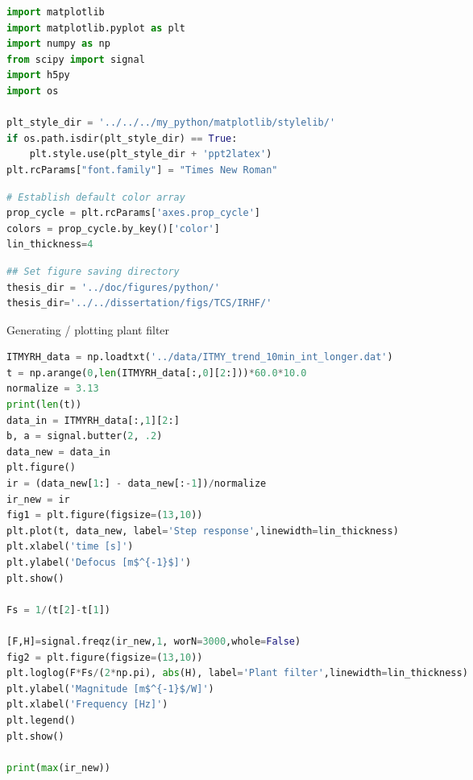 \begin{spacing}{1.2} \begin{lstlisting}[frame=single,language=Python]
import matplotlib
import matplotlib.pyplot as plt
import numpy as np
from scipy import signal
import h5py
import os

plt_style_dir = '../../../my_python/matplotlib/stylelib/'
if os.path.isdir(plt_style_dir) == True:
    plt.style.use(plt_style_dir + 'ppt2latex')
plt.rcParams["font.family"] = "Times New Roman"
\end{lstlisting} \end{spacing}

\begin{spacing}{1.2} \begin{lstlisting}[frame=single,language=Python]
# Establish default color array
prop_cycle = plt.rcParams['axes.prop_cycle']
colors = prop_cycle.by_key()['color']
lin_thickness=4
\end{lstlisting} \end{spacing}

\begin{spacing}{1.2} \begin{lstlisting}[frame=single,language=Python]
## Set figure saving directory
thesis_dir = '../doc/figures/python/'
thesis_dir='../../dissertation/figs/TCS/IRHF/'
\end{lstlisting} \end{spacing}

Generating / plotting plant filter

\begin{spacing}{1.2} \begin{lstlisting}[frame=single,language=Python]
ITMYRH_data = np.loadtxt('../data/ITMY_trend_10min_int_longer.dat')
t = np.arange(0,len(ITMYRH_data[:,0][2:]))*60.0*10.0
normalize = 3.13
print(len(t))
data_in = ITMYRH_data[:,1][2:]
b, a = signal.butter(2, .2)
data_new = data_in
plt.figure()
ir = (data_new[1:] - data_new[:-1])/normalize
ir_new = ir
fig1 = plt.figure(figsize=(13,10))
plt.plot(t, data_new, label='Step response',linewidth=lin_thickness)
plt.xlabel('time [s]')
plt.ylabel('Defocus [m$^{-1}$]')
plt.show()

Fs = 1/(t[2]-t[1])

[F,H]=signal.freqz(ir_new,1, worN=3000,whole=False) 
fig2 = plt.figure(figsize=(13,10))
plt.loglog(F*Fs/(2*np.pi), abs(H), label='Plant filter',linewidth=lin_thickness)
plt.ylabel('Magnitude [m$^{-1}$/W]')
plt.xlabel('Frequency [Hz]')
plt.legend()
plt.show()

print(max(ir_new))
\end{lstlisting} \end{spacing}

